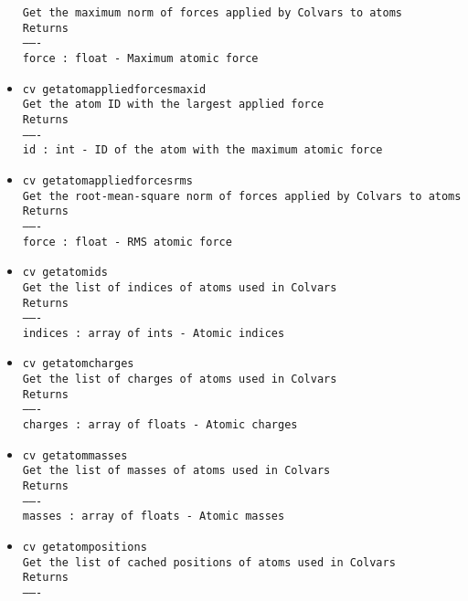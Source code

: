 \begin{itemize}
\texttt{Get the maximum norm of forces applied by Colvars to atoms}
\\
\texttt{Returns}
\\
\texttt{-------}
\\
\texttt{force : float - Maximum atomic force}
\item \texttt{cv getatomappliedforcesmaxid}
\\
\texttt{Get the atom ID with the largest applied force}
\\
\texttt{Returns}
\\
\texttt{-------}
\\
\texttt{id : int - ID of the atom with the maximum atomic force}
\item \texttt{cv getatomappliedforcesrms}
\\
\texttt{Get the root-mean-square norm of forces applied by Colvars to atoms}
\\
\texttt{Returns}
\\
\texttt{-------}
\\
\texttt{force : float - RMS atomic force}
\item \texttt{cv getatomids}
\\
\texttt{Get the list of indices of atoms used in Colvars}
\\
\texttt{Returns}
\\
\texttt{-------}
\\
\texttt{indices : array of ints - Atomic indices}
\item \texttt{cv getatomcharges}
\\
\texttt{Get the list of charges of atoms used in Colvars}
\\
\texttt{Returns}
\\
\texttt{-------}
\\
\texttt{charges : array of floats - Atomic charges}
\item \texttt{cv getatommasses}
\\
\texttt{Get the list of masses of atoms used in Colvars}
\\
\texttt{Returns}
\\
\texttt{-------}
\\
\texttt{masses : array of floats - Atomic masses}
\item \texttt{cv getatompositions}
\\
\texttt{Get the list of cached positions of atoms used in Colvars}
\\
\texttt{Returns}
\\
\texttt{-------}
\\

\end{itemize}
